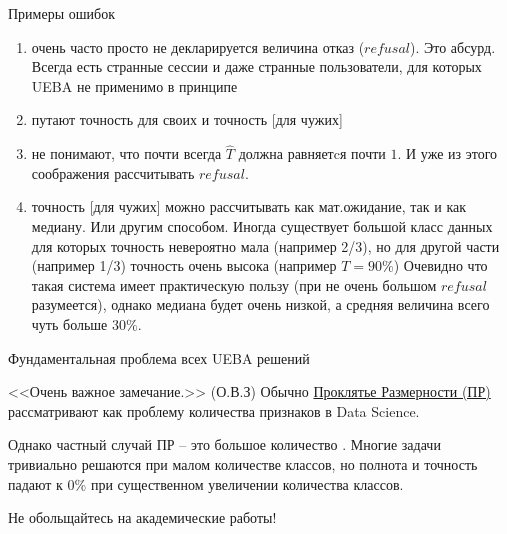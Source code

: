 \begin{frame}{Примеры ошибок}
	\small
	\begin{enumerate}
		\item очень часто просто не декларируется величина отказ ($refusal$).
		Это абсурд. Всегда есть странные сессии и даже странные пользователи,
		для которых  UEBA не применимо в принципе
		\item путают точность для своих и точность [для чужих]
		\item не понимают, что почти всегда $\hat T$ должна равняетcя почти $1$.
		И уже из этого соображения рассчитывать $refusal$.
		\item точность [для чужих] можно рассчитывать как мат.ожидание, так и как медиану.
		Или другим способом.
		Иногда существует большой класс данных для которых точность невероятно мала 
		(например 2/3), но для другой части (например 1/3) точность очень высока (например $T=90\%$)
		Очевидно что такая система имеет практическую пользу 
		(при не очень большом $refusal$ разумеется), однако медиана будет очень низкой,
		а средняя величина всего чуть больше $30\%$.
	\end{enumerate}
\end{frame}

\begin{frame}{Фундаментальная проблема всех UEBA решений}
\begin{block}{<<Очень важное замечание.>> (О.В.З)}
	Обычно \href{https\%3A\%2F\%2Fru.wikipedia.org\%2Fwiki\%2F\%D0\%9F\%D1\%80\%D0\%BE\%D0\%BA\%D0\%BB\%D1\%8F\%D1\%82\%D0\%B8\%D0\%B5_\%D1\%80\%D0\%B0\%D0\%B7\%D0\%BC\%D0\%B5\%D1\%80\%D0\%BD\%D0\%BE\%D1\%81\%D1\%82\%D0\%B8}{Проклятье Размерности (ПР)}
	рассматривают как проблему количества признаков в Data Science.
	
	Однако частный случай ПР -- это большое количество .
	Многие задачи тривиально решаются при малом количестве классов, 
	но полнота и точность падают к 0\% при существенном увеличении количества классов.
	
	Не обольщайтесь на академические работы!
\end{block}
\end{frame}

